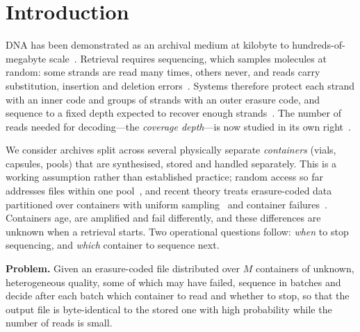 \documentclass[conference,onecolumn,11pt]{IEEEtran}
\begin{document}
\section{Introduction}
DNA has been demonstrated as an archival medium at kilobyte to hundreds-of-megabyte
scale~\cite{church2012next,goldman2013towards,grass2015robust,erlich2017fountain,organick2018random}.
Retrieval requires sequencing, which samples molecules at random: some strands are read
many times, others never, and reads carry substitution, insertion and deletion
errors~\cite{heckel2019characterization,gimpel2023digital}.  Systems therefore protect each
strand with an inner code and groups of strands with an outer erasure code, and sequence to a
fixed depth expected to recover enough strands~\cite{grass2015robust,organick2018random}.  The
number of reads needed for decoding---the \emph{coverage depth}---is now studied in its own
right~\cite{barlev2025cover,gruica2024combinatorial}.

We consider archives split across several physically separate \emph{containers} (vials,
capsules, pools) that are synthesised, stored and handled separately.  This is a working
assumption rather than established practice; random access so far addresses files within one
pool~\cite{bornholt2016dna,organick2018random}, and recent theory treats erasure-coded data
partitioned over containers with uniform sampling~\cite{kong2026coverage} and container
failures~\cite{levy2026expected}.  Containers age, are amplified and fail differently, and
these differences are unknown when a retrieval starts.  Two operational questions follow:
\emph{when} to stop sequencing, and \emph{which} container to sequence next.

\textbf{Problem.}  Given an erasure-coded file distributed over $M$ containers of unknown,
heterogeneous quality, some of which may have failed, sequence in batches and decide after
each batch which container to read and whether to stop, so that the output file is
byte-identical to the stored one with high probability while the number of reads is small.
\end{document}

